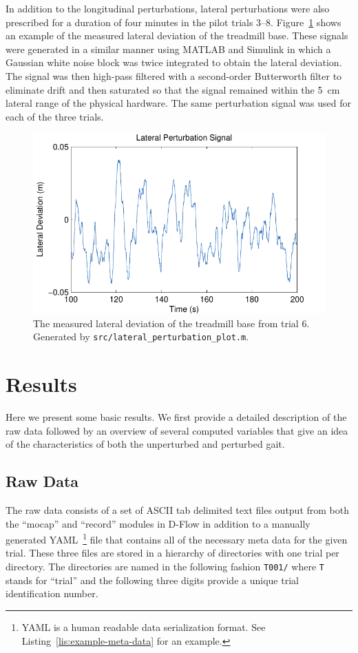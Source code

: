 \documentclass[fleqn,12pt]{wlpeerj}
\begin{document}
In addition to the longitudinal perturbations, lateral perturbations were also
prescribed for a duration of four minutes in the pilot trials 3--8.
Figure~\ref{fig:lateral_perturbation} shows an example of the measured lateral
deviation of the treadmill base. These signals were generated in a similar
manner using MATLAB and Simulink in which a Gaussian white noise block was
twice integrated to obtain the lateral deviation. The signal was then high-pass
filtered with a second-order Butterworth filter to eliminate drift and then
saturated so that the signal remained within the 5~\si{\centi\meter} lateral
range of the physical hardware. The same perturbation signal was used for each
of the three trials.
%
\begin{figure}
  \centering
  \includegraphics{figures/lateral_perturbation.pdf}
  \cprotect\caption{The measured lateral deviation of the treadmill base from
    trial 6. Generated by \verb|src/lateral_perturbation_plot.m|.}
  \label{fig:lateral_perturbation}
\end{figure}

\section*{Results}
%
Here we present some basic results. We first provide a detailed description of
the raw data followed by an overview of several computed variables that give an
idea of the characteristics of both the unperturbed and perturbed gait.

\subsection*{Raw Data}
%
The raw data consists of a set of ASCII tab delimited text files output from
both the ``mocap'' and ``record'' modules in D-Flow in addition to a manually
generated YAML~\footnote{YAML is a human readable data serialization format.
See Listing~\ref{lis:example-meta-data} for an example.} file that contains all
of the necessary meta data for the given trial. These three files are stored
in a hierarchy of directories with one trial per directory. The directories are
named in the following fashion \verb+T001/+ where \verb+T+ stands for ``trial''
and the following three digits provide a unique trial identification number.
\end{document}
